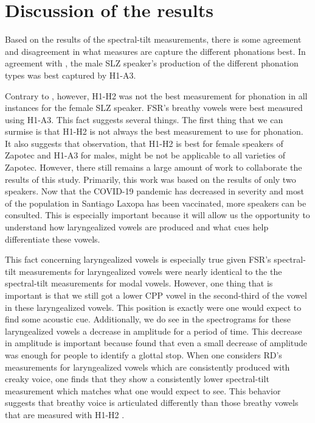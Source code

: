 \documentclass[12pt, letterpaper]{article}
\begin{document}
\section{Discussion of the results} \label{sec:Discussion}

Based on the results of the spectral-tilt measurements, there is some agreement and disagreement in what measures are capture the different phonations best. In agreement with \citet{espositoVariationContrastivePhonation2010}, the male SLZ speaker's production of the different phonation types was best captured by H1-A3. 

Contrary to \citet{espositoVariationContrastivePhonation2010}, however, H1-H2 was not the best measurement for phonation in all instances for the female SLZ speaker. FSR's breathy vowels were best measured using H1-A3. This fact suggests several things. The first thing that we can surmise is that H1-H2 is not always the best measurement to use for phonation. It also suggests that  observation, that H1-H2 is best for female speakers of Zapotec and H1-A3 for males, might be not be applicable to all varieties of Zapotec. However, there still remains a large amount of work to collaborate the results of this study. Primarily, this work was based on the results of only two speakers. Now that the COVID-19 pandemic has decreased in severity and most of the population in Santiago Laxopa has been vaccinated, more speakers can be consulted. This is especially important because it will allow us the opportunity to understand how laryngealized vowels are produced and what cues help differentiate these vowels. 

This fact concerning laryngealized vowels is especially true given FSR's spectral-tilt measurements for laryngealized vowels were nearly identical to the the spectral-tilt measurements for modal vowels. However, one thing that is important is that we still got a lower CPP vowel in the second-third of the vowel in these laryngealized vowels. This position is exactly were one would expect to find some acoustic cue. Additionally, we do see in the spectrograms for these laryngealized vowels a decrease in amplitude for a period of time. This decrease in amplitude is important because \citet{gerfenProductionPerceptionLaryngealized2005} found that even a small decrease of amplitude was enough for people to identify a glottal stop. When one considers RD's measurements for laryngealized vowels which are consistently produced with creaky voice, one finds that they show a consistently lower spectral-tilt measurement which matches what one would expect to see. This behavior suggests that breathy voice is articulated differently than those breathy vowels that are measured with H1-H2 \citep{espositoVariationContrastivePhonation2010}. 
\end{document}
